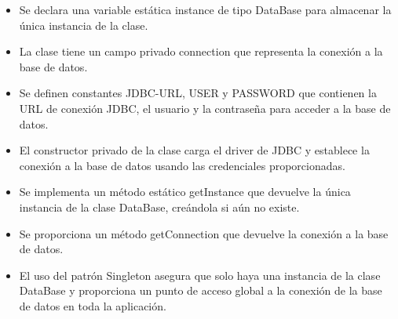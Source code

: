 \documentclass{article}
\begin{document}
        \begin{itemize}	
            \item Se declara una variable estática instance de tipo DataBase para almacenar la única instancia de la clase.
            \item La clase tiene un campo privado connection que representa la conexión a la base de datos.
            \item Se definen constantes JDBC-URL, USER y PASSWORD que contienen la URL de conexión JDBC, el usuario y la contraseña para acceder a la base de datos.
            \item El constructor privado de la clase carga el driver de JDBC y establece la conexión a la base de datos usando las credenciales proporcionadas.
            \item Se implementa un método estático getInstance que devuelve la única instancia de la clase DataBase, creándola si aún no existe.
            \item Se proporciona un método getConnection que devuelve la conexión a la base de datos.
            \item El uso del patrón Singleton asegura que solo haya una instancia de la clase DataBase y proporciona un punto de acceso global a la conexión de la base de datos en toda la aplicación.
	\end{itemize}
    

    
\end{document}
